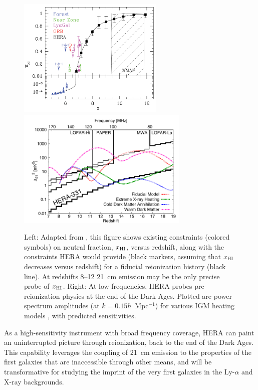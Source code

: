\documentclass[preprint]{aastex}
\def\HI{{H{\small I }}}
\def\xHI{{x_{\rm\HI}}}
\begin{document}
\begin{figure}[t]\centering
\includegraphics[height=2.25in]{plots/constraints.pdf}
\includegraphics[height=2.25in]{plots/Xray/HERA_II_compare_kp1_whoriz_20pt.pdf} 
\caption{\small 
Left: 
Adapted from \citet{robertson_2013}, this figure shows existing
constraints (colored symbols) on neutral fraction, $\xHI$, versus redshift, along with 
the constraints HERA would provide (black markers, assuming
that $\xHI$ decreases versus redshift) for a fiducial
reionization history (black line).
At redshifts 8--12
21~cm emission may be the only precise probe of $\xHI$.
Right: At low frequencies, HERA probes
pre-reionization physics at the end of the Dark Ages. Plotted are power spectrum amplitudes (at $k =
0.15h$~Mpc$^{-1}$) for various IGM heating models \citep{mesinger_et_al2013},
with predicted sensitivities.
}\label{fig:x_i_vs_z} \end{figure}

As a high-sensitivity instrument with broad frequency coverage, HERA can
paint an uninterrupted picture through reionization, back to the end of 
the Dark Ages. This capability leverages the coupling of
21~cm emission to the properties of the first galaxies that
are inaccessible through other means,  and will be transformative for
studying the imprint of the very first galaxies in the Ly-$\alpha$ and X-ray backgrounds.  
\end{document}
